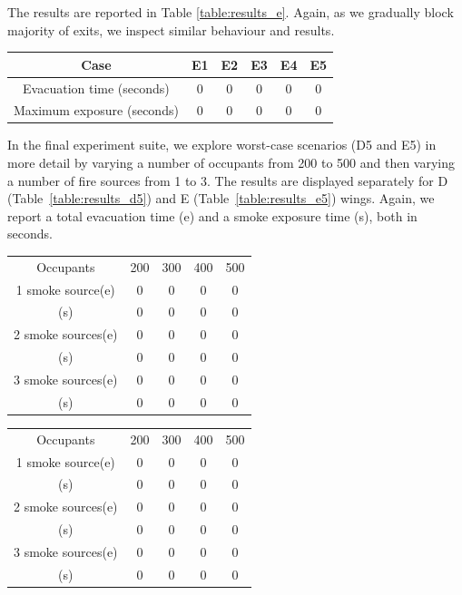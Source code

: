 The results are reported in Table \ref{table:results_e}.
Again, as we gradually block majority of exits, we inspect similar behaviour and
results.

\begin{center}
    \label{table:results_e}
    \begin{tabular}{ c | c | c | c | c | c }
        \hline
        Case & E1 & E2 & E3 & E4 & E5 \\
        \hline
        Evacuation time (seconds) & 0 & 0 & 0 & 0 & 0 \\
        Maximum exposure (seconds) & 0 & 0 & 0 & 0 & 0 \\
        \hline
    \end{tabular}
\end{center}

In the final experiment suite, we explore worst-case scenarios (D5 and E5) in
more detail by varying a number of occupants from 200 to 500 and then varying
a number of fire sources from 1 to 3.
The results are displayed separately for D (Table~\ref{table:results_d5})
and E (Table~\ref{table:results_e5}) wings.
Again, we report a total evacuation time (e) and a smoke exposure time (s),
both in seconds.

\begin{center}
    \label{table:results_d5}
    \begin{tabular}{ c | c | c | c | c }
        \hline
        Occupants & 200 & 300 & 400 & 500 \\
        1 smoke source(e) & 0 & 0 & 0 & 0 \\
        (s) & 0 & 0 & 0 & 0 \\
        2 smoke sources(e) & 0 & 0 & 0 & 0 \\
        (s) & 0 & 0 & 0 & 0 \\
        3 smoke sources(e) & 0 & 0 & 0 & 0 \\
        (s) & 0 & 0 & 0 & 0 \\
        \hline
    \end{tabular}
\end{center}


\begin{center}
    \label{table:results_e5}
    \begin{tabular}{ c | c | c | c | c }
        \hline
        Occupants & 200 & 300 & 400 & 500 \\
        1 smoke source(e) & 0 & 0 & 0 & 0 \\
        (s) & 0 & 0 & 0 & 0 \\
        2 smoke sources(e) & 0 & 0 & 0 & 0 \\
        (s) & 0 & 0 & 0 & 0 \\
        3 smoke sources(e) & 0 & 0 & 0 & 0 \\
        (s) & 0 & 0 & 0 & 0 \\
        \hline
    \end{tabular}
\end{center}


